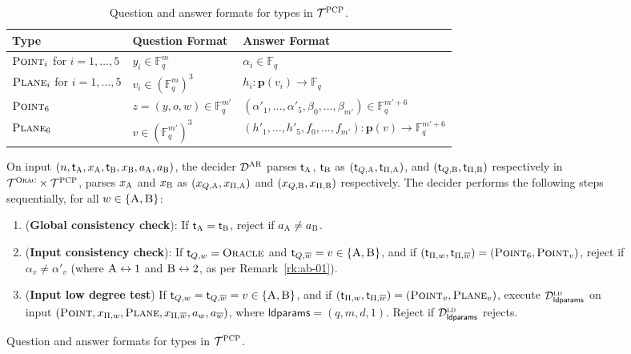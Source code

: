\documentclass[11pt]{article}
\theoremstyle{definition}
\newcommand{\ol}[1]{\overline{#1}}
\newcommand{\F}{\ensuremath{\mathbb{F}}}
\newcommand{\ld}{\textsc{ld}}
\newcommand{\pl}{\mathbf{p}}
\newcommand{\decider}{\mathcal{D}}
\newcommand{\type}{\mathcal{T}}
\newcommand{\gamestyle}[1]{\ensuremath{\textsc{#1}}\xspace}
\newcommand{\ora}{\gamestyle{Orac}}
\newcommand{\pcp}{\gamestyle{PCP}}
\newcommand{\ar}{\gamestyle{AR}}
\newcommand{\labelstyle}[1]{\ensuremath{\textsc{#1}}\xspace}
\newcommand{\tvarstyle}[1]{\mathsf{#1}}
\newcommand{\tvar}{\ensuremath{\tvarstyle{t}}}
\newcommand{\alice}{\labelstyle{A}}
\newcommand{\bob}{\labelstyle{B}}
\newcommand{\oracle}{\labelstyle{Oracle}}
\newcommand{\typestyle}[1]{\ensuremath{\textsc{#1}}\xspace}
\newcommand{\Plane}{\typestyle{Plane}}
\newcommand{\Point}{\typestyle{Point}}
\newcommand{\ldparams}{\mathsf{ldparams}}
\newenvironment{gamespec}{
  \begin{mdframed}[style=figstyle]}{
  \end{mdframed}}
\begin{document}
\begin{figure}[!htb]
  \begin{gamespec}
    \begin{table}[H]
      \centering
      \begin{tabularx}{\textwidth}{ l l X }
        \toprule
        Type & Question Format & Answer Format \\
        \midrule
        $\Point_i$ for $i=1, \ldots, 5$ & $y_i \in \F_q^m$ &
        $\alpha_i \in \F_q$ \\
        $\Plane_i$ for $i=1, \ldots, 5$ & $v_i \in (\F_q^m)^3$ &
        $h_i: \pl(v_i) \to \F_q$ \\
        $\Point_6$ & $z = (y, o, w) \in \F_q^{m'}$ & $(\alpha'_1, \ldots,
        \alpha'_5, \beta_0, \ldots, \beta_{m'}) \in \F_q^{m'+6}$\\
        $\Plane_6$ & $v \in (\F_q^{m'})^3$ & $(h'_1, \dots,
        h'_5, f_0, \dots, f_{m'}): \pl(v) \to \F_q^{m' + 6}$ \\
        \bottomrule
      \end{tabularx}
      \caption{Question and answer formats for types in $\type^\pcp$.}
    \end{table}

    On input $(n, \tvar_\alice, x_\alice, \tvar_\bob, x_\bob, a_\alice,
    a_\bob)$, the decider $\decider^\ar$ parses $\tvar_\alice$, $\tvar_\bob$ as
    $(\tvar_{Q,\alice}, \tvar_{\Pi, \alice})$, and $(\tvar_{Q,\bob},
    \tvar_{\Pi,\bob})$ respectively in $ \type^\ora \times \type^\pcp$, parses
    $x_\alice$ and $x_\bob$ as $(x_{Q,\alice}, x_{\Pi,\alice})$ and
    $(x_{Q,\bob}, x_{\Pi,\bob})$ respectively.
    The decider performs the following steps sequentially, for all
    $w\in\{\alice,\bob\}$:
    \begin{enumerate}
    \item (\textbf{Global consistency check}): If $\tvar_{\alice} =
      \tvar_{\bob}$, reject if $a_\alice\neq a_\bob$.
      \label{enu:ar-global-consistency}

    \item (\textbf{Input consistency check}): If $\tvar_{Q,w} = \oracle$ and
      $\tvar_{Q, \ol{w}} = v \in \{\alice,\bob\}$, and if $(\tvar_{\Pi,w},
      \tvar_{\Pi, \ol{w}}) = (\Point_6, \Point_{v})$, reject if $\alpha_{v} \neq
      \alpha'_{v}$ (where $\alice \leftrightarrow 1$ and $\bob \leftrightarrow
      2$, as per Remark~\ref{rk:ab-01}).
      \label{enu:ar-input-consistency}

    \item (\textbf{Input low degree test}) If $\tvar_{Q,w} = \tvar_{Q,\ol{w}} =
      v \in \{\alice,\bob\}$, and if $(\tvar_{\Pi,w}, \tvar_{\Pi, \ol{w}}) =
      (\Point_{v}, \Plane_{v})$, execute $\decider^\ld_\ldparams$ on input
      $(\Point, x_{\Pi,w} ,\Plane,x_{\Pi,\overline{w}}, a_w,a_{\ol{w}})$, where
      $\ldparams = (q,m,d,1)$.
      Reject if $\decider^\ld_{\ldparams}$ rejects.
      \label{enu:ar-input-ld}


\end{enumerate}
\end{gamespec}
\end{figure}
\end{document}
